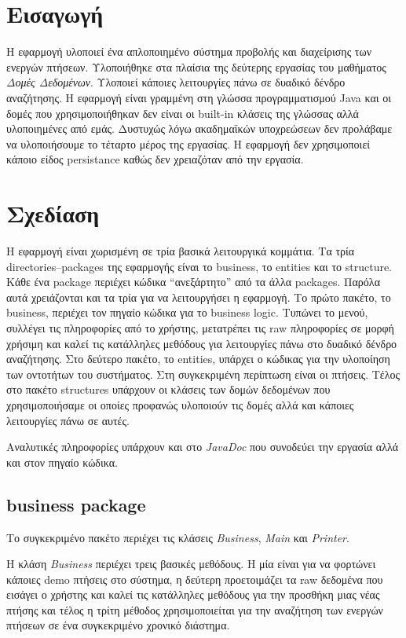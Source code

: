 \documentclass[a4paper]{article}
\begin{document}

\tableofcontents
\newpage
\section{Εισαγωγή}
Η εφαρμογή υλοποιεί ένα απλοποιημένο σύστημα προβολής και διαχείρισης των
ενεργών πτήσεων. Υλοποιήθηκε στα πλαίσια της δεύτερης εργασίας του μαθήματος
\emph{Δομές Δεδομένων}. Υλοποιεί κάποιες λειτουργίες πάνω σε δυαδικό δένδρο
αναζήτησης. Η εφαρμογή είναι γραμμένη στη γλώσσα προγραμματισμού Java και οι 
δομές που χρησιμοποιήθηκαν δεν είναι οι built-in κλάσεις της γλώσσας αλλά
υλοποιημένες από εμάς. Δυστυχώς λόγω ακαδημαϊκών υποχρεώσεων δεν προλάβαμε να
υλοποιήσουμε το τέταρτο μέρος της εργασίας. Η εφαρμογή δεν χρησιμοποιεί κάποιο
είδος persistance καθώς δεν χρειαζόταν από την εργασία.
\section{Σχεδίαση}
Η εφαρμογή είναι χωρισμένη σε τρία βασικά λειτουργικά κομμάτια. Τα τρία
directories--packages της εφαρμογής είναι το business, το entities και το
structure. Κάθε ένα package περιέχει κώδικα ``ανεξάρτητο'' από τα άλλα packages.
Παρόλα αυτά χρειάζονται και τα τρία για να λειτουργήσει η εφαρμογή. Το πρώτο
πακέτο, το business, περιέχει τον πηγαίο κώδικα για το business logic. Τυπώνει
το μενού, συλλέγει τις πληροφορίες από το χρήστης, μετατρέπει τις raw
πληροφορίες σε μορφή χρήσιμη και καλεί τις κατάλληλες μεθόδους για λειτουργίες
πάνω στο δυαδικό δένδρο αναζήτησης. Στο δεύτερο πακέτο, το entities, υπάρχει ο
κώδικας για την υλοποίηση των οντοτήτων του συστήματος. Στη συγκεκριμένη
περίπτωση είναι οι πτήσεις. Τέλος στο πακέτο structures υπάρχουν οι κλάσεις των
δομών δεδομένων που χρησιμοποιήσαμε οι οποίες προφανώς υλοποιούν τις δομές αλλά
και κάποιες λειτουργίες πάνω σε αυτές.

Αναλυτικές πληροφορίες υπάρχουν και στο \emph{JavaDoc} που συνοδεύει την εργασία
αλλά και στον πηγαίο κώδικα.

\subsection{business package}
Το συγκεκριμένο πακέτο περιέχει τις κλάσεις \emph{Business}, \emph{Main} και
\emph{Printer}.

Η κλάση \emph{Business} περιέχει τρεις βασικές μεθόδους. Η μία είναι για να
φορτώνει κάποιες demo πτήσεις στο σύστημα, η δεύτερη προετοιμάζει τα raw
δεδομένα που εισάγει ο χρήστης και καλεί τις κατάλληλες μεθόδους για την
προσθήκη μιας νέας πτήσης και τέλος η τρίτη μέθοδος χρησιμοποιείται για την
αναζήτηση των ενεργών πτήσεων σε ένα συγκεκριμένο χρονικό διάστημα.
\end{document}
